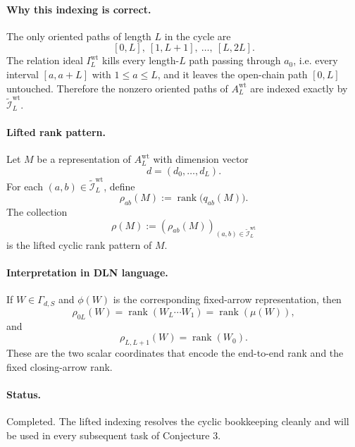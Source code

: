 \paragraph{Why this indexing is correct.}
The only oriented paths of length \(L\) in the cycle are
\[
[0,L],\ [1,L+1],\ \dots,\ [L,2L].
\]
The relation ideal \(I_L^{\mathrm{wt}}\) kills every length-\(L\) path passing
through \(a_0\), i.e. every interval \([a,a+L]\) with \(1\le a\le L\), and it
leaves the open-chain path \([0,L]\) untouched. Therefore the nonzero oriented
paths of \(A_L^{\mathrm{wt}}\) are indexed exactly by
\(\widetilde{\mathcal I}_L^{\mathrm{wt}}\).

\paragraph{Lifted rank pattern.}
Let \(M\) be a representation of \(A_L^{\mathrm{wt}}\) with dimension vector
\[
d=(d_0,\dots,d_L).
\]
For each \((a,b)\in \widetilde{\mathcal I}_L^{\mathrm{wt}}\), define
\[
\rho_{ab}(M):=\operatorname{rank}\bigl(q_{ab}(M)\bigr).
\]
The collection
\[
\rho(M):=(\rho_{ab}(M))_{(a,b)\in \widetilde{\mathcal I}_L^{\mathrm{wt}}}
\]
is the lifted cyclic rank pattern of \(M\).

\paragraph{Interpretation in DLN language.}
If \(W\in \Gamma_{d,S}\) and \(\phi(W)\) is the corresponding fixed-arrow
representation, then
\[
\rho_{0L}(W)=\operatorname{rank}(W_L\cdots W_1)=\operatorname{rank}(\mu(W)),
\]
and
\[
\rho_{L,L+1}(W)=\operatorname{rank}(W_0).
\]
These are the two scalar coordinates that encode the end-to-end rank and the
fixed closing-arrow rank.

\paragraph{Status.}
Completed. The lifted indexing resolves the cyclic bookkeeping cleanly and will
be used in every subsequent task of Conjecture 3.
